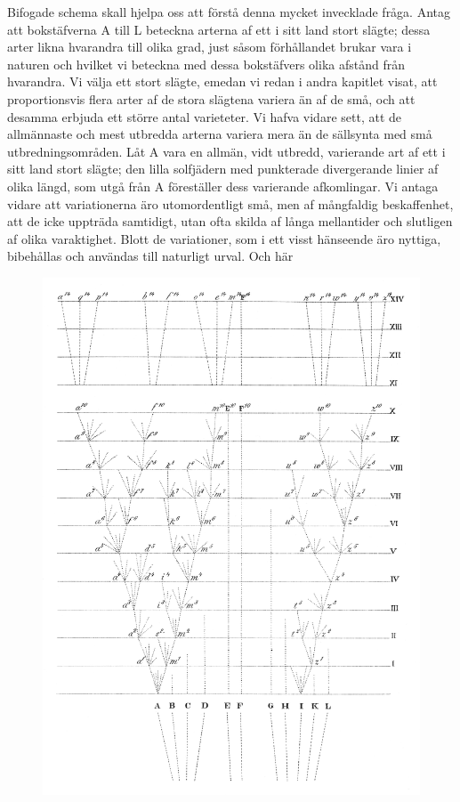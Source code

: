 Bifogade schema skall hjelpa oss att förstå denna mycket invecklade fråga. Antag att bokstäfverna A till L beteckna arterna af ett i sitt land stort slägte; dessa arter likna hvarandra till olika grad, just såsom förhållandet brukar vara i naturen och hvilket vi beteckna med dessa bokstäfvers olika afstånd från hvarandra. Vi välja ett stort slägte, emedan vi redan i andra kapitlet visat, att proportionsvis flera arter af de stora slägtena variera än af de små, och att desamma erbjuda ett större antal varieteter. Vi hafva vidare sett, att de allmännaste och mest utbredda arterna variera mera än de sällsynta med små utbredningsområden. Låt A vara en allmän, vidt utbredd, varierande art af ett i sitt land stort slägte; den lilla solfjädern med punkterade divergerande linier af olika längd, som utgå från A föreställer dess varierande afkomlingar. Vi antaga vidare att variationerna äro utomordentligt små, men af mångfaldig beskaffenhet, att de icke uppträda samtidigt, utan ofta skilda af långa mellantider och slutligen af olika varaktighet. Blott de variationer, som i ett visst hänseende äro nyttiga, bibehållas och användas till naturligt urval. Och här

\begin{figure}
\includegraphics{bilder/plansch_1}
\label{fig:inverkan}
\end{figure}

